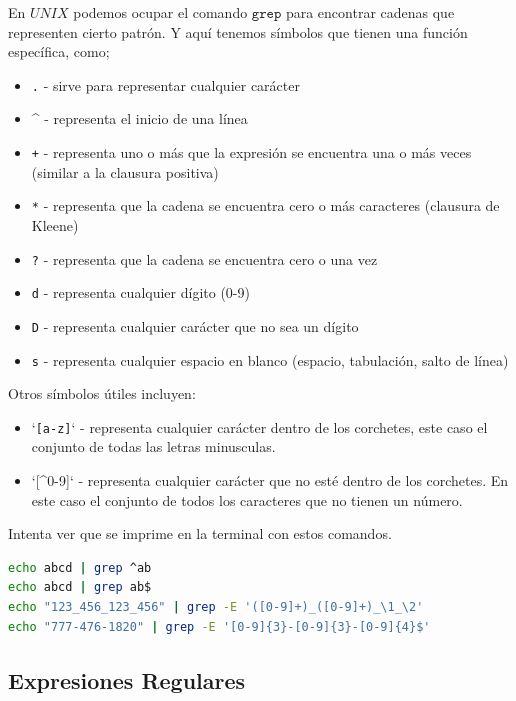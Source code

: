 En $UNIX$ podemos ocupar el comando $\texttt{grep}$ para encontrar cadenas que representen cierto patrón. Y aquí tenemos 
símbolos que tienen una función específica, como;

\begin{itemize}
    \item \texttt{.} - sirve para representar cualquier carácter
    \item \^{} - representa el inicio de una línea
    \item \texttt{+} - representa uno o más que la expresión se encuentra una o más veces (similar a la clausura positiva)
    \item \texttt{*} - representa que la cadena se encuentra cero o más caracteres (clausura de Kleene)
    \item \texttt{?} - representa que la cadena se encuentra cero o una vez
    \item \texttt{d} - representa cualquier dígito (0-9)
    \item \texttt{D} - representa cualquier carácter que no sea un dígito
    \item \texttt{s} - representa cualquier espacio en blanco (espacio, tabulación, salto de línea)
\end{itemize}

Otros símbolos útiles incluyen:

\begin{itemize}
    \item `\texttt{[a-z]}` - representa cualquier carácter dentro de los corchetes, este caso el conjunto de todas las letras minusculas. 
    \item `[\^{}0-9]` - representa cualquier carácter que no esté dentro de los corchetes. En este caso el conjunto de todos los caracteres que no tienen un número. 
\end{itemize}

Intenta ver que se imprime en la terminal con estos comandos. 

\begin{lstlisting}[language=bash]
echo abcd | grep ^ab
echo abcd | grep ab$
echo "123_456_123_456" | grep -E '([0-9]+)_([0-9]+)_\1_\2'
echo "777-476-1820" | grep -E '[0-9]{3}-[0-9]{3}-[0-9]{4}$'
\end{lstlisting}

\subsection{Expresiones Regulares}

